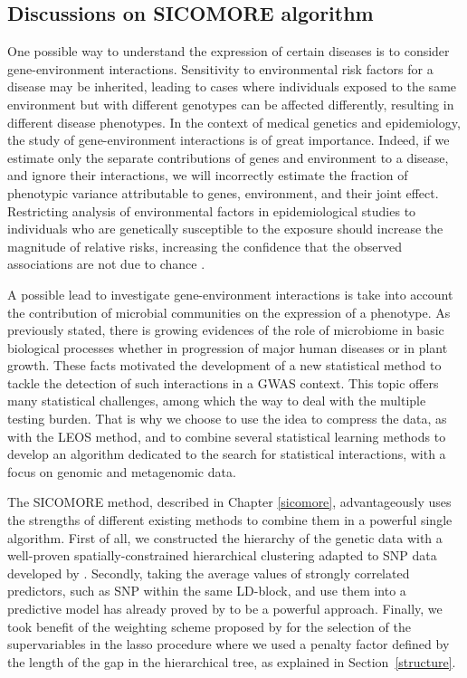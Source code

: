 \documentclass[]{book}
\begin{document}
\hypertarget{discussions-on-sicomore-algorithm}{%
\subsection*{Discussions on SICOMORE algorithm}\label{discussions-on-sicomore-algorithm}}

One possible way to understand the expression of certain diseases is to
consider gene-environment interactions. Sensitivity to environmental
risk factors for a disease may be inherited, leading to cases where
individuals exposed to the same environment but with different genotypes
can be affected differently, resulting in different disease phenotypes.
In the context of medical genetics and epidemiology, the study of
gene-environment interactions is of great importance. Indeed, if we
estimate only the separate contributions of genes and environment to a
disease, and ignore their interactions, we will incorrectly estimate the
fraction of phenotypic variance attributable to genes, environment, and
their joint effect. Restricting analysis of environmental factors in
epidemiological studies to individuals who are genetically susceptible
to the exposure should increase the magnitude of relative risks,
increasing the confidence that the observed associations are not due to
chance \citep{hunter2005gene}.

A possible lead to investigate gene-environment interactions is take
into account the contribution of microbial communities on the expression
of a phenotype. As previously stated, there is growing evidences of the
role of microbiome in basic biological processes whether in progression
of major human diseases or in plant growth. These facts motivated the
development of a new statistical method to tackle the detection of such
interactions in a GWAS context. This topic offers many statistical
challenges, among which the way to deal with the multiple testing
burden. That is why we choose to use the idea to compress the data, as
with the LEOS method, and to combine several statistical learning
methods to develop an algorithm dedicated to the search for statistical
interactions, with a focus on genomic and metagenomic data.

The SICOMORE method, described in Chapter \ref{sicomore},
advantageously uses the strengths of different existing methods to
combine them in a powerful single algorithm. First of all, we
constructed the hierarchy of the genetic data with a well-proven
spatially-constrained hierarchical clustering adapted to SNP data
developed by \citep{dehman_performance_2015}. Secondly, taking the average
values of strongly correlated predictors, such as SNP within the same
LD-block, and use them into a predictive model has already proved by
\citep{park_averaged_2007} to be a powerful approach. Finally, we took
benefit of the weighting scheme proposed by \citep{grimonprez_selection_2016}
for the selection of the supervariables in the lasso procedure where we
used a penalty factor defined by the length of the gap in the
hierarchical tree, as explained in Section~\ref{structure}.
\end{document}
